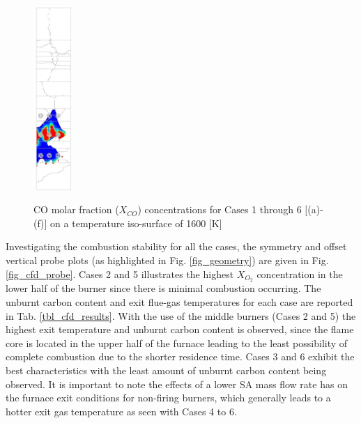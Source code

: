 \documentclass[twocolumn,10pt]{asme2ej}
\begin{document}
\begin{figure}[h!]
{				\includegraphics[height = 7cm]{FBRM05_ISO_COPPM_S}}
\caption{CO molar fraction ($X_{CO}$) concentrations for 
Cases 1 through 6 [(a)-(f)] on a temperature iso-surface of 1600 [K]}
\label{fig_cfd_coppm}
\end{figure}

Investigating the combustion stability for all the cases, the symmetry and offset vertical probe plots (as highlighted in Fig. \ref{fig_geometry}) are given in Fig. \ref{fig_cfd_probe}. Cases 2 and 5 illustrates the highest $X_{O_{2}}$ concentration in the lower half of the burner since there is minimal combustion occurring. The unburnt carbon content and exit flue-gas temperatures for each case are reported in Tab. \ref{tbl_cfd_results}. With the use of the middle burners (Cases 2 and 5) the highest exit temperature and unburnt carbon content is observed, since the flame core is located in the upper half of the furnace leading to the least possibility of complete combustion due to the shorter residence time. Cases 3 and 6 exhibit the best characteristics with the least amount of unburnt carbon content being observed. It is important to note the effects of a lower SA mass flow rate has on the furnace exit conditions for non-firing burners, which generally leads to a hotter exit gas temperature as seen with Cases 4 to 6. 
\end{document}
